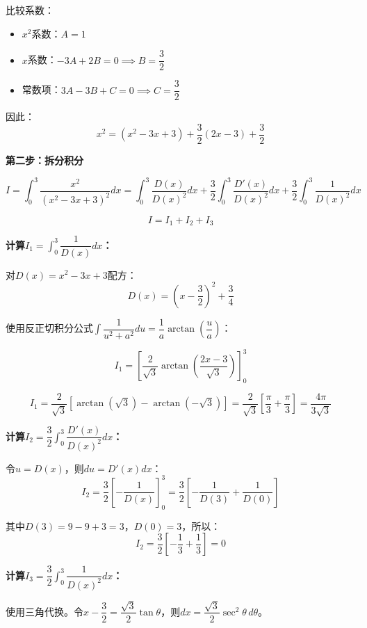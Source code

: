\documentclass[standard]{ExBook}
\begin{document}
\begin{qitems}
\begin{bbox}
\begin{solution}
            比较系数：
            \begin{itemize}
                \item $x^2$系数：$A = 1$
                \item $x$系数：$-3A + 2B = 0 \implies B = \dfrac{3}{2}$
                \item 常数项：$3A - 3B + C = 0 \implies C = \dfrac{3}{2}$
            \end{itemize}
            
            因此：
            $$x^2 = (x^2 - 3x + 3) + \frac{3}{2}(2x - 3) + \frac{3}{2}$$
            
            \textbf{第二步：拆分积分}
            
            $$I = \int_0^3 \frac{x^2}{(x^2 - 3x + 3)^2} dx = \int_0^3 \frac{D(x)}{D(x)^2} dx + \frac{3}{2}\int_0^3 \frac{D'(x)}{D(x)^2} dx + \frac{3}{2}\int_0^3 \frac{1}{D(x)^2} dx$$
            
            $$I = I_1 + I_2 + I_3$$
            
            \textbf{计算$I_1 = \int_0^3 \dfrac{1}{D(x)} dx$：}
            
            对$D(x) = x^2 - 3x + 3$配方：
            $$D(x) = \left(x - \frac{3}{2}\right)^2 + \frac{3}{4}$$
            
            使用反正切积分公式$\int \dfrac{1}{u^2 + a^2}du = \dfrac{1}{a}\arctan\left(\dfrac{u}{a}\right)$：
            
            $$I_1 = \left[\frac{2}{\sqrt{3}}\arctan\left(\frac{2x-3}{\sqrt{3}}\right)\right]_0^3$$
            
            $$I_1 = \frac{2}{\sqrt{3}}\left[\arctan(\sqrt{3}) - \arctan(-\sqrt{3})\right] = \frac{2}{\sqrt{3}}\left[\frac{\pi}{3} + \frac{\pi}{3}\right] = \frac{4\pi}{3\sqrt{3}}$$
            
            \textbf{计算$I_2 = \dfrac{3}{2}\int_0^3 \dfrac{D'(x)}{D(x)^2} dx$：}
            
            令$u = D(x)$，则$du = D'(x)dx$：
            $$I_2 = \frac{3}{2}\left[-\frac{1}{D(x)}\right]_0^3 = \frac{3}{2}\left[-\frac{1}{D(3)} + \frac{1}{D(0)}\right]$$
            
            其中$D(3) = 9 - 9 + 3 = 3$，$D(0) = 3$，所以：
            $$I_2 = \frac{3}{2}\left[-\frac{1}{3} + \frac{1}{3}\right] = 0$$
            
            \textbf{计算$I_3 = \dfrac{3}{2}\int_0^3 \dfrac{1}{D(x)^2} dx$：}
            
            使用三角代换。令$x - \dfrac{3}{2} = \dfrac{\sqrt{3}}{2}\tan\theta$，则$dx = \dfrac{\sqrt{3}}{2}\sec^2\theta\, d\theta$。
            

\end{solution}
\end{bbox}
\end{qitems}
\end{document}
